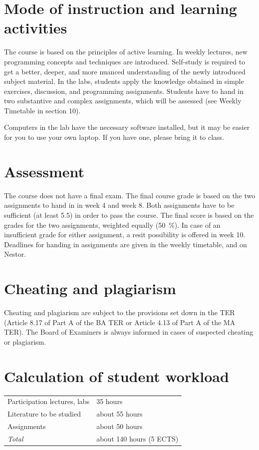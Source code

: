 \documentclass[a4paper,12pt]{article}
\begin{document}
\section{Mode of instruction and learning activities}
The course is based on the principles of active learning. In weekly lectures,
new programming concepts and techniques are introduced. Self-study is
required to get a better, deeper, and more nuanced understanding of the newly
introduced subject material. In the labs, students apply the knowledge obtained
in simple exercises, discussion, and programming assignments. Students have to
hand in two substantive and complex assignments, which will be assessed (see
Weekly Timetable in section 10). %

Computers in the lab have the necessary software installed, but it may be
easier for you to use your own laptop. If you have one, please bring it to
class.

\section{Assessment}
The course does not have a final exam. The final course grade is based on the
two assignments to hand in in week 4 and week 8. Both assignments have to be
sufficient (at least 5.5) in order to pass the course. The final score is based
on the grades for the two assignments, weighted equally (50~\%).
In case of an insufficient grade for either assignment, a resit possibility is
offered in week 10. Deadlines for handing in assignments are given in the
weekly timetable, and on Nestor.

\section{Cheating and plagiarism}
Cheating and plagiarism are subject to the provisions set down in the TER
(Article 8.17 of Part A of the BA TER or Article 4.13 of Part A of the MA TER).
The Board of Examiners is always informed in cases of suspected cheating or
plagiarism.

\section{Calculation of student workload}
\begin{tabular}{ll}
    Participation lectures, labs   & 35 hours \\
    Literature to be studied       & about 55 hours \\
    Assignments                    & about 50 hours \\
    \emph{Total}                   & about 140 hours (5 ECTS) \\
\end{tabular}
\end{document}
